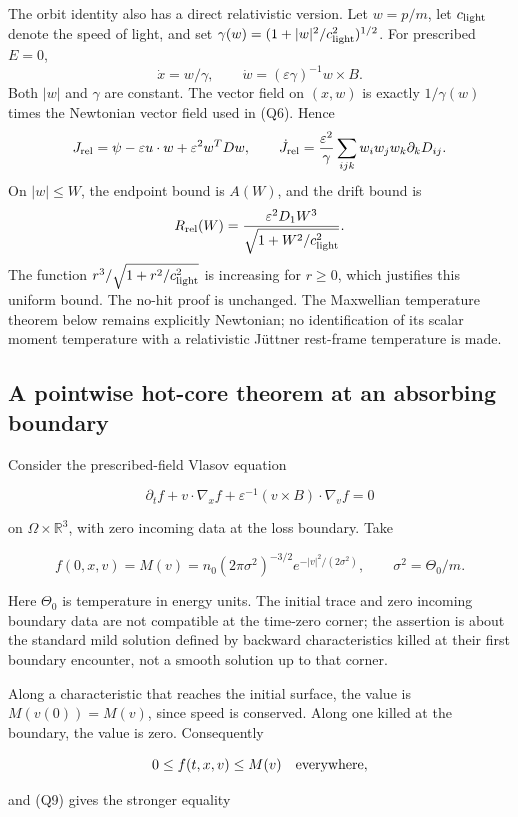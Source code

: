 The orbit identity also has a direct relativistic version. Let \(w=p/m\), let
\(c_{\rm light}\) denote the speed of light, and set
\(\gamma(w)=(1+|w|^2/c_{\rm light}^2)^{1/2}\). For prescribed \(E=0\),
\[
\dot x=w/\gamma,\qquad
\dot w=(\varepsilon\gamma)^{-1}w\times B.
\] Both \(|w|\) and \(\gamma\) are constant. The vector field on
\((x,w)\) is exactly \(1/\gamma(w)\) times the Newtonian vector field
used in (Q6). Hence \[
J_{\rm rel}=\psi-\varepsilon u\cdot w+\varepsilon^2w^TDw,\qquad
\dot J_{\rm rel}=\frac{\varepsilon^2}{\gamma}
\sum_{ijk}w_iw_jw_k\partial_kD_{ij}.
\] On \(|w|\le W\), the endpoint bound is \(A(W)\), and the drift bound
is \[
R_{\rm rel}(W)=
\frac{\varepsilon^2D_1W^3}
{\sqrt{1+W^2/c_{\rm light}^2}}.
\] The function \(r^3/\sqrt{1+r^2/c_{\rm light}^2}\) is increasing for
\(r\ge0\), which justifies this uniform bound. The no-hit proof is
unchanged. The Maxwellian temperature theorem below remains explicitly
Newtonian; no identification of its scalar moment temperature with a
relativistic Jüttner rest-frame temperature is made.

\subsection{A pointwise hot-core theorem at an absorbing
boundary}\label{a-pointwise-hot-core-theorem-at-an-absorbing-boundary}

Consider the prescribed-field Vlasov equation

\[
\partial_t f+v\cdot\nabla_xf+
\varepsilon^{-1}(v\times B)\cdot\nabla_vf=0
\]

on \(\Omega\times\mathbb R^3\), with zero incoming data at the loss
boundary. Take

\[
f(0,x,v)=M(v)
=n_0(2\pi\sigma^2)^{-3/2}e^{-|v|^2/(2\sigma^2)},
\qquad \sigma^2=\Theta_0/m.
\tag{H1}
\]

Here \(\Theta_0\) is temperature in energy units. The initial trace and
zero incoming boundary data are not compatible at the time-zero corner;
the assertion is about the standard mild solution defined by backward
characteristics killed at their first boundary encounter, not a smooth
solution up to that corner.

Along a characteristic that reaches the initial surface, the value is
\(M(v(0))=M(v)\), since speed is conserved. Along one killed at the
boundary, the value is zero. Consequently

\[
0\le f(t,x,v)\le M(v)
\quad\hbox{everywhere},
\]

and (Q9) gives the stronger equality

